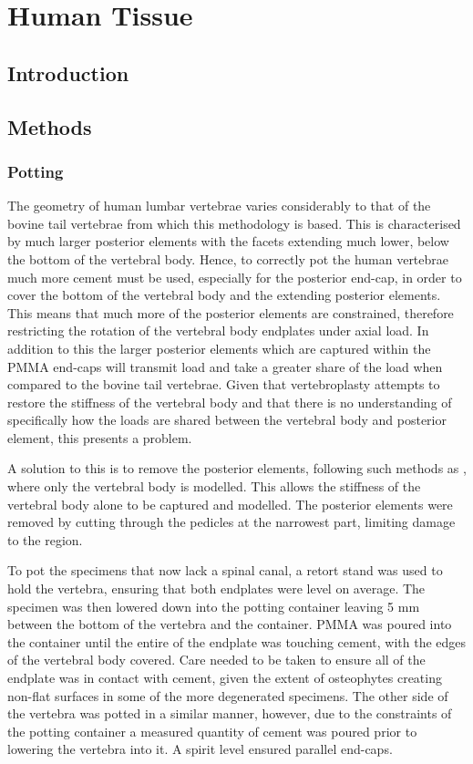 \chapter{Human Tissue}

\section{Introduction}


\section{Methods}

\subsection{Potting}

The geometry of human lumbar vertebrae varies considerably to that of the bovine tail vertebrae from which this methodology is based.
This is characterised by much larger posterior elements with the facets extending much lower, below the bottom of the vertebral body.
Hence, to correctly pot the human vertebrae much more cement must be used, especially for the posterior end-cap, in order to cover the bottom of the vertebral body and the extending posterior elements.
This means that much more of the posterior elements are constrained, therefore restricting the rotation of the vertebral body endplates under axial load.
In addition to this the larger posterior elements which are captured within the PMMA end-caps will transmit load and take a greater share of the load when compared to the bovine tail vertebrae.
Given that vertebroplasty attempts to restore the stiffness of the vertebral body and that there is no understanding of specifically how the loads are shared between the vertebral body and posterior element, this presents a problem.

A solution to this is to remove the posterior elements, following such methods as \cite{Wijayathunga2008,RobsonBrown2014}, where only the vertebral body is modelled.
This allows the stiffness of the vertebral body alone to be captured and modelled.
The posterior elements were removed by cutting through the pedicles at the narrowest part, limiting damage to the region.

To pot the specimens that now lack a spinal canal, a retort stand was used to hold the vertebra, ensuring that both endplates were level on average.
The specimen was then lowered down into the potting container leaving 5 mm between the bottom of the vertebra and the container.
PMMA was poured into the container until the entire of the endplate was touching cement, with the edges of the vertebral body covered.
Care needed to be taken to ensure all of the endplate was in contact with cement, given the extent of osteophytes creating non-flat surfaces in some of the more degenerated specimens.
The other side of the vertebra was potted in a similar manner, however, due to the constraints of the potting container a measured quantity of cement was poured prior to lowering the vertebra into it.
A spirit level ensured parallel end-caps.

